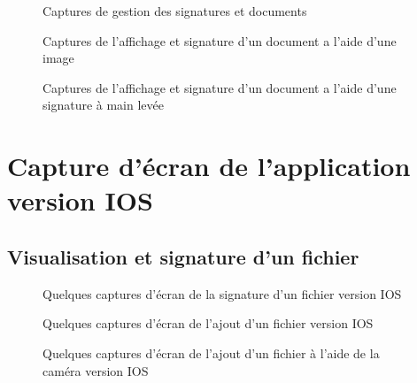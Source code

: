 \begin{figure}[H]
    \centering
    \caption{Captures de gestion des signatures et documents}
    \label{appendix:capture_app4}
\end{figure}

\begin{figure}[H]
    \centering
    \caption{Captures de l'affichage et signature d'un document a l'aide d'une image}
    \label{appendix:capture_app4_2}
\end{figure}

\begin{figure}[H]
    \centering
    \caption{Captures de l'affichage et signature d'un document a l'aide d'une signature à main levée}
    \label{appendix:capture_app4_3}
\end{figure}




\section{Capture d'écran de l'application version IOS}

\subsection{Visualisation et signature d’un fichier}
\label{appendix:ios_view_sign}
\begin{figure}[H]
    \centering
    \caption{Quelques captures d'écran de la signature d’un fichier version IOS}
    \label{appendix:sign_doc_ios}
\end{figure}

\begin{figure}[H]
    \centering
    \caption{Quelques captures d'écran de l'ajout d'un fichier version IOS}
    \label{appendix:upload_file_ios}
\end{figure}

\begin{figure}[H]
    \centering
    \caption{Quelques captures d'écran de l'ajout d'un fichier à l'aide de la caméra version IOS}
    \label{appendix:add_file_scan_ios}
\end{figure}

